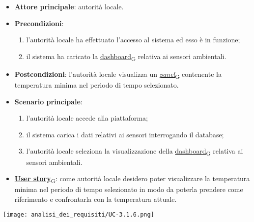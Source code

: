 \begin{itemize}
	\item \textbf{Attore principale}: autorità locale.
	\item \textbf{Precondizioni}:
	      \begin{enumerate}
		      \item l'autorità locale ha effettuato l'accesso al sistema ed esso è in funzione;
		      \item il sistema ha caricato la \href{https://7last.github.io/docs/pb/documentazione-interna/glossario\#dashboard}{dashboard\textsubscript{G}} relativa ai sensori ambientali.
	      \end{enumerate}
	\item \textbf{Postcondizioni}: l'autorità locale visualizza un \href{https://7last.github.io/docs/pb/documentazione-interna/glossario\#panel}{\textit{panel}\textsubscript{G}} contenente la temperatura minima nel periodo di tempo selezionato.
	\item \textbf{Scenario principale}:
	      \begin{enumerate}
		      \item l'autorità locale accede alla piattaforma;
		      \item il sistema carica i dati relativi ai sensori interrogando il database;
		      \item l'autorità locale seleziona la visualizzazione della \href{https://7last.github.io/docs/pb/documentazione-interna/glossario\#dashboard}{dashboard\textsubscript{G}} relativa ai sensori ambientali.
	      \end{enumerate}
	\item \href{https://7last.github.io/docs/pb/documentazione-interna/glossario\#user-story}{\textbf{User story}\textsubscript{G}}:
	      come autorità locale desidero poter visualizzare la temperatura minima nel periodo di tempo selezionato
	      in modo da poterla prendere come riferimento e confrontarla con la temperatura attuale.
\end{itemize}
\begin{center}
	\texttt{[image: analisi\_dei\_requisiti/UC-3.1.6.png]}
\end{center}


